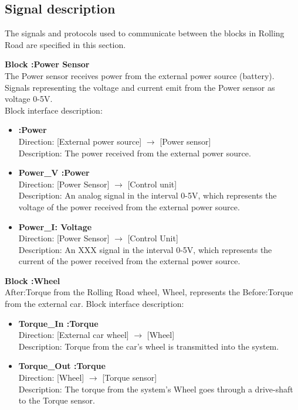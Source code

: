 \subsection{Signal description}
The signals and protocols used to communicate between the blocks in Rolling Road are specified in this section.

\textbf{Block :Power Sensor}\\
The Power sensor receives power from the external power source (battery). Signals representing the voltage and current emit from the Power sensor as voltage 0-5V.\\
Block interface description:

\begin{itemize}
	\item \textbf{:Power}\\
		Direction: [External power source] $\rightarrow$ [Power sensor]\\
		Description: The power received from the external power source.
	\item \textbf{Power\_V :Power}\\
		Direction: [Power Sensor] $\rightarrow$ [Control unit]\\
		Description: An analog signal in the interval 0-5V, which represents the voltage of the power received from the external power source.
	\item \textbf{Power\_I: Voltage}\\
		Direction: [Power Sensor] $\rightarrow$ [Control Unit]\\
		Description: An XXX signal in the interval 0-5V, which represents the current of the power received from the external power source.
\end{itemize}

\textbf{Block :Wheel}\\
After:Torque from the Rolling Road wheel, Wheel, represents the Before:Torque from the external car. 
Block interface description:

\begin{itemize}
	\item \textbf{Torque\_In :Torque}\\
		Direction: [External car wheel] $\rightarrow$ [Wheel]\\
		Description: Torque from the car's wheel is transmitted into the system.
	\item \textbf{Torque\_Out :Torque}\\
		Direction: [Wheel] $\rightarrow$ [Torque sensor]\\
		Description: The torque from the system's Wheel goes through a drive-shaft to the Torque sensor.
\end{itemize}

